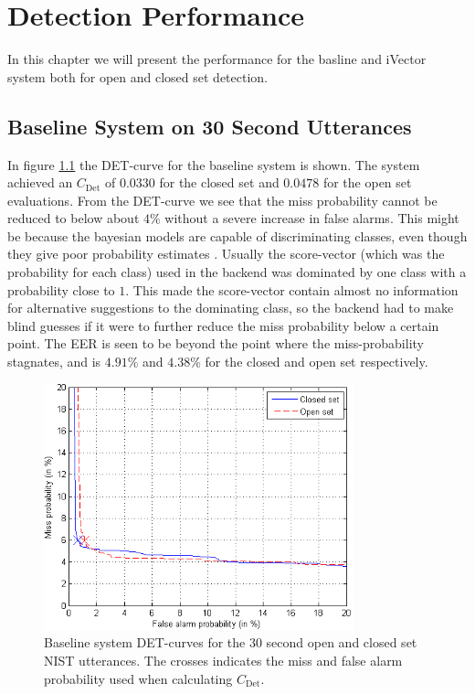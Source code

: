\chapter{Detection Performance}

In this chapter we will present the performance for the basline and iVector system both for open and closed set detection.

\section{Baseline System on 30 Second Utterances}

In figure \ref{fig:basedet30} the DET-curve for the baseline system is shown. The system achieved an $C_{\text{Det}}$ of $0.0330$ for the closed set and $0.0478$ for the open set evaluations. From the DET-curve we see that the miss probability cannot be reduced to below about $4$\% without a severe increase in false alarms. This might be because the bayesian models are capable of discriminating classes, even though they give poor probability estimates \cite{mccallum1998comparison}. Usually the score-vector (which was the probability for each class) used in the backend was dominated by one class with a probability close to $1$. This made the score-vector contain almost no information for alternative suggestions to the dominating class, so the backend had to make blind guesses if it were to further reduce the miss probability below a certain point. The EER is seen to be beyond the point where the miss-probability stagnates, and is $4.91$\% and $4.38$\% for the closed and open set respectively.

\begin{figure}[hbt!]
\begin{center}
	\includegraphics[width=0.8\textwidth]{figures/baseDet30.png}
\end{center}
\caption{Baseline system DET-curves for the 30 second open and closed set NIST utterances. The crosses indicates the miss and false alarm probability used when calculating $C_{\text{Det}}$.}
\label{fig:basedet30}
\end{figure}

